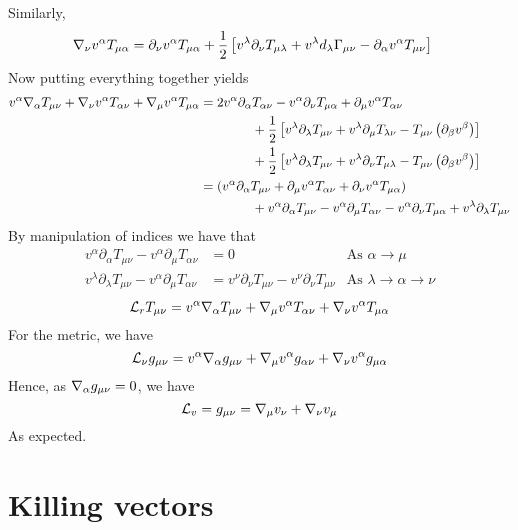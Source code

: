 \documentclass{article}
\begin{document}
	Similarly,
	\begin{align*}
		\nabla_\nu v^\alpha T_{\mu\alpha} &= \partial_\nu v^\alpha T_{\mu\alpha} +\frac12 \left[ v^\lambda \partial_\nu T_{\mu\lambda} + v^\lambda d_\lambda \Gamma_{\mu\nu} - \partial_\alpha v^\alpha T_{\mu\nu}\right]
	\end{align*}
	Now putting everything together yields
	\begin{align*}
		v^\alpha \nabla_\alpha T_{\mu\nu} + \nabla_\nu v^\alpha T_{\alpha\nu} + \nabla_\mu v^\alpha T_{\mu\alpha} &= 2 v^\alpha \partial_\alpha T_{\alpha \nu} - v^\alpha \partial_\nu T_{\mu\alpha} + \partial_\mu v^\alpha T_{\alpha \nu}\\
		&\quad\quad\quad\quad + \frac12 \left[ v^\lambda \partial_\lambda T_{\mu\nu} + v^\lambda \partial_\mu T_{\lambda\nu} - T_{\mu\nu} \left( \partial_\beta v^\beta \right)\right] \\
		&\quad\quad\quad\quad + \frac12 \left[ v^\lambda \partial_\lambda T_{\mu\nu} + v^\lambda \partial_\nu T_{\mu\lambda} - T_{\mu\nu} \left( \partial_\beta v^\beta \right)\right] \\
		&= \left( v^\alpha \partial_\alpha T_{\mu\nu} + \partial_\mu v^\alpha T_{\alpha\nu} + \partial_\nu v^\alpha T_{\mu\alpha}\right) \\
		&\quad\quad\quad\quad+ v^\alpha \partial_\alpha T_{\mu\nu} - v^\alpha \partial_\mu T_{\alpha\nu} - v^\alpha \partial_\nu T_{\mu\alpha} + v^\lambda \partial_\lambda T_{\mu\nu}
	\end{align*}
	By manipulation of indices we have that
	\begin{align*}
		v^\alpha \partial_\alpha T_{\mu\nu} - v^\alpha \partial_\mu T_{\alpha\nu} &= 0 & \text{As }\alpha \to \mu\\
		v^\lambda \partial_\lambda T_{\mu\nu} - v^\alpha \partial_\mu T_{\alpha\nu} &= v^\nu \partial_\nu T_{\mu\nu} - v^\nu \partial_\nu T_{\mu\nu} & \text{As }\lambda \to \alpha \to \nu
	\end{align*}
	$$ \mathcal{L}_r T_{\mu\nu}  = v^\alpha \nabla_\alpha T_{\mu\nu} +\nabla_\mu v^\alpha T_{\alpha\nu} + \nabla_\nu v^\alpha T_{\mu\alpha}$$
	For the metric, we have
	$$ \mathcal{L}_\nu g_{\mu\nu} = v^{\alpha} \nabla_\alpha g_{\mu\nu} +\nabla_\mu v^\alpha g_{\alpha\nu} + \nabla_\nu v^\alpha g_{\mu\alpha}$$
	Hence, as $\nabla_\alpha g_{\mu\nu} = 0$, we have
	$$ \mathcal{L}_v = g_{\mu\nu} = \nabla_{\mu} v_\nu + \nabla_\nu v_\mu$$
	As expected.
	\pagebreak
	\section{Killing vectors}
\end{document}
